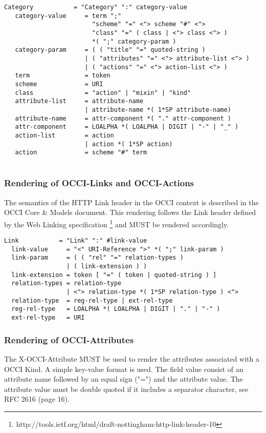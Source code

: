 \documentclass[10pt,a4paper]{article}
\begin{document}
\begin{verbatim}
Category           = "Category" ":" category-value
   category-value     = term ";"
                        "scheme" "=" <"> scheme "#" <">
                        "class" "=" ( class | <"> class <"> )
                        *( ";" category-param )
   category-param     = ( ( "title" "=" quoted-string )
                      | ( "attributes" "=" <"> attribute-list <"> )
                      | ( "actions" "=" <"> action-list <"> )
   term               = token
   scheme             = URI
   class              = "action" | "mixin" | "kind"
   attribute-list     = attribute-name
                      | attribute-name *( 1*SP attribute-name)
   attribute-name     = attr-component *( "." attr-component )
   attr-component     = LOALPHA *( LOALPHA | DIGIT | "-" | "_" )
   action-list        = action 
                      | action *( 1*SP action)
   action             = scheme "#" term
   
\end{verbatim}

\subsubsection{Rendering of OCCI-Links and OCCI-Actions}
The semantics of the HTTP Link header in the OCCI context is described in
the OCCI Core \& Models document. This rendering follows the
  Link header defined by the Web Linking specification
  \footnote{http://tools.ietf.org/html/draft-nottingham-http-link-header-10} and
  MUST be rendered accordingly.

\begin{verbatim}
Link           = "Link" ":" #link-value
  link-value     = "<" URI-Reference ">" *( ";" link-param )
  link-param     = ( ( "rel" "=" relation-types )
                 | ( link-extension ) )
  link-extension = token [ "=" ( token | quoted-string ) ]
  relation-types = relation-type
                 | <"> relation-type *( 1*SP relation-type ) <">
  relation-type  = reg-rel-type | ext-rel-type
  reg-rel-type   = LOALPHA *( LOALPHA | DIGIT | "." | "-" )
  ext-rel-type   = URI
\end{verbatim}

\subsubsection{Rendering of OCCI-Attributes}
The X-OCCI-Attribute MUST be used to render the attributes associated
with a OCCI Kind. A simple key-value format is used. The field value
consist of an attribute name followed by an equal sign ("=") and the
attribute value. The attribute value must be double quoted if it
includes a separator character, see RFC 2616 (page 16).
\end{document}
